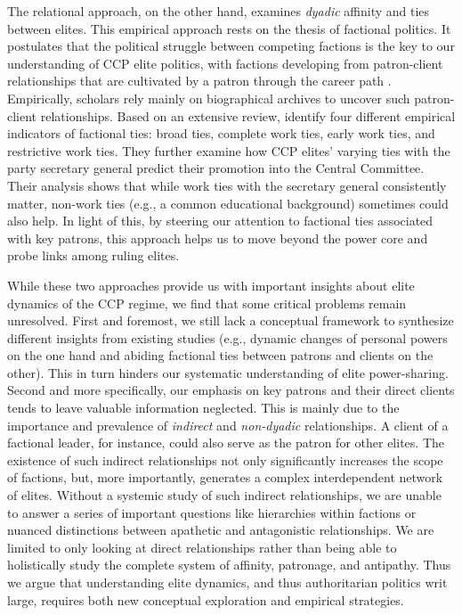 \documentclass[11pt,english]{article}
\begin{document}
\begin{flushleft}
The relational approach, on the other hand, examines \emph{dyadic} affinity and ties between elites. This empirical approach rests on the thesis of factional politics. It postulates that the political struggle between competing factions is the key to our understanding of CCP elite politics, with factions developing from patron-client relationships that are cultivated by a patron through the career path \citep{Pye1981,Nathan1995,Huang2000,Shih2010,Shih2012}. Empirically, scholars rely mainly on biographical archives to uncover such patron-client relationships. Based on an extensive review, \citet{Meyer2016} identify four different empirical indicators of factional ties: broad ties, complete work ties, early work ties, and restrictive work ties. They further examine how CCP elites' varying ties with the party secretary general predict their promotion into the Central Committee. Their analysis shows that while work ties with the secretary general consistently matter, non-work ties (e.g., a common educational background) sometimes could also help. In light of this, by steering our attention to factional ties associated with key patrons, this approach helps us to move beyond the power core and probe links among ruling elites.

While these two approaches provide us with important insights about elite dynamics of the CCP regime, we find that some critical problems remain unresolved. First and foremost, we still lack a conceptual framework to synthesize different insights from existing studies (e.g., dynamic changes of personal powers on the one hand and abiding factional ties between patrons and clients on the other). This in turn hinders our systematic understanding of elite power-sharing. Second and more specifically, our emphasis on key patrons and their direct clients tends to leave valuable information neglected. This is mainly due to the importance and prevalence of \emph{indirect} and \emph{non-dyadic} relationships. A client of a factional leader, for instance, could also serve as the patron for other elites.  The existence of such indirect relationships not only significantly increases the scope of factions, but, more importantly, generates a complex interdependent network of elites. Without a systemic study of such indirect relationships, we are unable to answer a series of important questions like hierarchies within factions or nuanced distinctions between apathetic and antagonistic relationships. We are limited to only looking at direct relationships rather than being able to holistically study the complete system of affinity, patronage, and antipathy. Thus we argue that  understanding elite dynamics, and thus authoritarian politics writ large, requires both new conceptual exploration and empirical strategies.


\end{flushleft}
\end{document}

